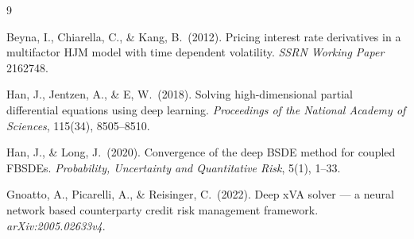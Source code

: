 \documentclass[11pt,a4paper]{article}
\begin{document}
\begin{thebibliography}{9}

Beyna, I., Chiarella, C., \& Kang, B.\ (2012).
Pricing interest rate derivatives in a multifactor HJM model with time
dependent volatility.
\textit{SSRN Working Paper} 2162748.

Han, J., Jentzen, A., \& E, W.\ (2018).
Solving high-dimensional partial differential equations using deep learning.
\textit{Proceedings of the National Academy of Sciences},
115(34), 8505--8510.

Han, J., \& Long, J.\ (2020).
Convergence of the deep BSDE method for coupled FBSDEs.
\textit{Probability, Uncertainty and Quantitative Risk}, 5(1), 1--33.

Gnoatto, A., Picarelli, A., \& Reisinger, C.\ (2022).
Deep xVA solver --- a neural network based counterparty credit risk management
framework.
\textit{arXiv:2005.02633v4}.

\end{thebibliography}
\end{document}
